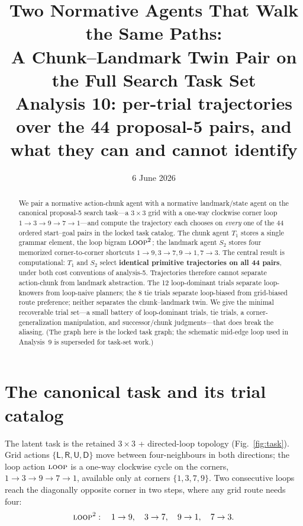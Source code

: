 \documentclass[10pt]{article}
\title{Two Normative Agents That Walk the Same Paths:\\
A Chunk--Landmark Twin Pair on the Full Search Task Set\\
\large Analysis 10: per-trial trajectories over the 44 proposal-5 pairs,
and what they can and cannot identify}
\author{}
\date{6 June 2026}
\begin{document}
\maketitle

\begin{abstract}
We pair a normative action-chunk agent with a normative landmark/state agent on the
canonical proposal-5 search task---a $3\times3$ grid with a one-way clockwise corner loop
$1\to3\to9\to7\to1$---and compute the trajectory each chooses on \emph{every} one of the
44 ordered start--goal pairs in the locked task catalog. The chunk agent $T_1$ stores a
single grammar element, the loop bigram $\textsc{loop}^2$; the landmark agent $S_2$ stores
four memorized corner-to-corner shortcuts $1\!\to\!9,3\!\to\!7,9\!\to\!1,7\!\to\!3$. The
central result is computational: $T_1$ and $S_2$ select \textbf{identical primitive
trajectories on all 44 pairs}, under both cost conventions of analysis-5. Trajectories
therefore cannot separate action-chunk from landmark abstraction. The 12 loop-dominant
trials separate loop-knowers from loop-naive planners; the 8 tie trials separate
loop-biased from grid-biased route preference; neither separates the chunk--landmark twin.
We give the minimal recoverable trial set---a small battery of loop-dominant trials, tie
trials, a corner-generalization manipulation, and successor/chunk judgments---that does
break the aliasing. (The graph here is the locked task graph; the schematic mid-edge loop
used in Analysis~9 is superseded for task-set work.)
\end{abstract}

\section{The canonical task and its trial catalog}

The latent task is the retained $3\times3$ + directed-loop topology
(Fig.~\ref{fig:task}). Grid actions $\{\textsf{L},\textsf{R},\textsf{U},\textsf{D}\}$ move
between four-neighbours in both directions; the loop action $\textsc{loop}$ is a one-way
clockwise cycle on the corners, $1\to3\to9\to7\to1$, available only at corners
$\{1,3,7,9\}$. Two consecutive loops reach the diagonally opposite corner in two steps,
where any grid route needs four:
\[
\textsc{loop}^2:\quad 1\to9,\quad 3\to7,\quad 9\to1,\quad 7\to3 .
\]
\end{document}

